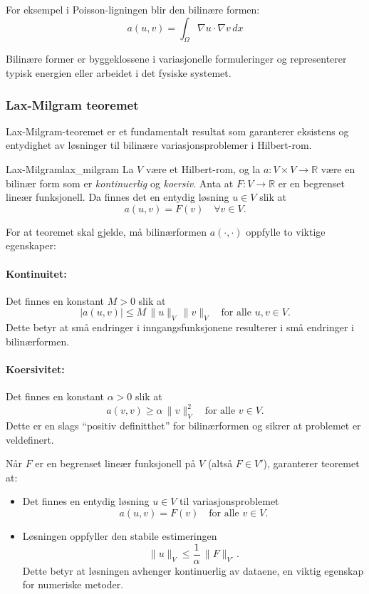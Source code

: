 For eksempel i Poisson-ligningen blir den bilinære formen:
\begin{equation}
	a(u,v) = \int_\Omega \nabla u \cdot \nabla v \, dx
\end{equation}

Bilinære former er byggeklossene i variasjonelle formuleringer og representerer typisk energien eller arbeidet i det fysiske systemet.

\subsubsection{Lax-Milgram teoremet}
\label{sec:lax_milgram}
Lax-Milgram-teoremet er et fundamentalt resultat som garanterer eksistens og entydighet av løsninger til bilinære variasjonsproblemer i Hilbert-rom.
\begin{theorem}{Lax-Milgram}{lax_milgram}
	La $V$ være et Hilbert-rom, og la $a: V \times V \to \mathbb{R}$ være en bilinær form som er \emph{kontinuerlig} og \emph{koersiv}. Anta at $F: V \to \mathbb{R}$ er en begrenset lineær funksjonell. Da finnes det en entydig løsning $u \in V$ slik at
	\[
		a(u,v) = F(v) \quad \forall v \in V.
	\]
\end{theorem}

For at teoremet skal gjelde, må bilinærformen $a(\cdot, \cdot)$ oppfylle to viktige egenskaper:

\paragraph{Kontinuitet:} Det finnes en konstant $M > 0$ slik at
\[
	|a(u,v)| \leq M\, \|u\|_V\, \|v\|_V \quad \text{for alle } u,v\in V.
\]
Dette betyr at små endringer i inngangsfunksjonene resulterer i små endringer i bilinærformen.

\paragraph{Koersivitet:} Det finnes en konstant $\alpha > 0$ slik at
\[
	a(v,v) \geq \alpha\, \|v\|_V^2 \quad \text{for alle } v\in V.
\]
Dette er en slags \enquote{positiv definitthet} for bilinærformen og sikrer at problemet er veldefinert.

Når $F$ er en begrenset lineær funksjonell på $V$ (altså $F \in V'$), garanterer teoremet at:
\begin{itemize}
	\item Det finnes en entydig løsning $u \in V$ til variasjonsproblemet
	      \[
		      a(u,v)=F(v) \quad \text{for alle } v\in V.
	      \]

	\item Løsningen oppfyller den stabile estimeringen
	      \[
		      \|u\|_V \leq \frac{1}{\alpha}\, \|F\|_{V'}.
	      \]
	      Dette betyr at løsningen avhenger kontinuerlig av dataene, en viktig egenskap for numeriske metoder.
\end{itemize}

